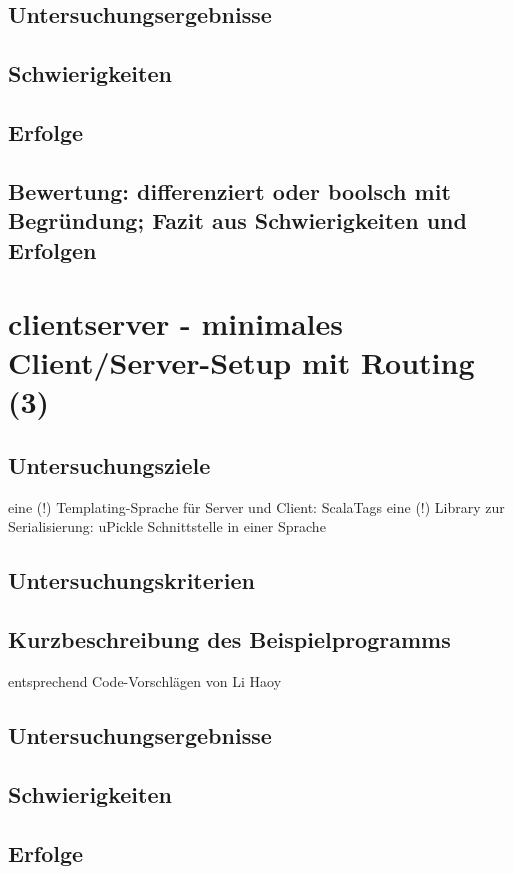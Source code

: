 \documentclass[a4paper, 12pt, listof=totoc, bibliography=totoc]{scrreprt}
\begin{document}
\subsection{Untersuchungsergebnisse}
\subsection{Schwierigkeiten}
\subsection{Erfolge}
\subsection{Bewertung: differenziert oder boolsch mit Begründung; Fazit aus Schwierigkeiten und Erfolgen}

\section{clientserver - minimales Client/Server-Setup mit Routing (3)}

\subsection{Untersuchungsziele}
eine (!) Templating-Sprache für Server und Client: ScalaTags \cite{haoyi.HOS}
eine (!) Library zur Serialisierung: uPickle \cite{haoyi.HOS}
Schnittstelle in einer Sprache

\subsection{Untersuchungskriterien}
\subsection{Kurzbeschreibung des Beispielprogramms}
entsprechend Code-Vorschlägen von Li Haoy\cite{haoyi.HOS}
\subsection{Untersuchungsergebnisse}
\subsection{Schwierigkeiten}
\subsection{Erfolge}
\end{document}
